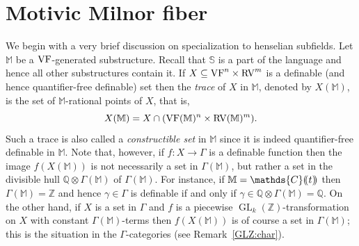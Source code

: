 \documentclass[12pt]{amsart}
\newcommand{\memph}[1]{{\color{magenta}\emph{#1}}}
\theoremstyle{plain}
\theoremstyle{definition}
\theoremstyle{remark}
\newtheorem{rem}[thm]{Remark}
\numberwithin{equation}{section}
\theoremstyle{plain}
\newcommand{\VF}{\textup{VF}}
\newcommand{\RV}{\textup{RV}}
\DeclareMathOperator{\mgl}{GL}
\newcommand{\Z}{\mathds{Z}}
\newcommand{\C}{\mathds{C}}
\newcommand{\Q}{\mathds{Q}}
\newcommand{\0}{\emptyset}
\newcommand{\dpar}[1]{%
   (\mkern-4mu (#1 )\mkern-4mu )}
\newcommand{\fun}{\longrightarrow}
\newcommand{\sub}{\subseteq}
\begin{document}
\section{Motivic Milnor fiber}\label{sec:spec:pui}

We begin with a very brief discussion on specialization to henselian subfields. Let $\mathbb{M}$ be a $\VF$-generated  substructure. Recall that $\mathbb{S}$ is a part of the language and hence all other substructures contain it. If $X \sub \VF^n  \times \RV^m$ is a definable (and hence quantifier-free definable) set then the \memph{trace} of $X$ in $\mathbb{M}$, denoted by $X(\mathbb{M})$, is the set of $\mathbb{M}$-rational points of $X$, that is,
\[
X(\mathbb{M}) = X \cap (\VF(\mathbb{M})^n  \times \RV(\mathbb{M})^m).
\]
Such a trace is also called a \memph{constructible set} in $\mathbb{M}$ since it is indeed quantifier-free definable in $\mathbb{M}$. Note that, however, if $f : X \fun \Gamma$ is a definable function then the image $f(X(\mathbb{M}))$  is not necessarily a set in $\Gamma(\mathbb{M})$, but rather a set in the divisible hull $\Q \otimes \Gamma(\mathbb{M})$  of $\Gamma(\mathbb{M})$. For instance, if $\mathbb{M} = \C \dpar t$ then $\Gamma(\mathbb{M}) = \Z$ and hence $\gamma \in \Gamma$ is definable if and only if $\gamma \in \Q \otimes \Gamma(\mathbb{M}) = \Q$. On the other hand, if $X$ is a set in $\Gamma$ and $f$ is a piecewise $\mgl_k(\Z)$-transformation on $X$ with constant $\Gamma(\mathbb{M})$-terms  then $f(X(\mathbb{M}))$ is of course a set in $\Gamma(\mathbb{M})$; this is the situation in the $\Gamma$-categories (see Remark~\ref{GLZ:char}).


\end{document}
